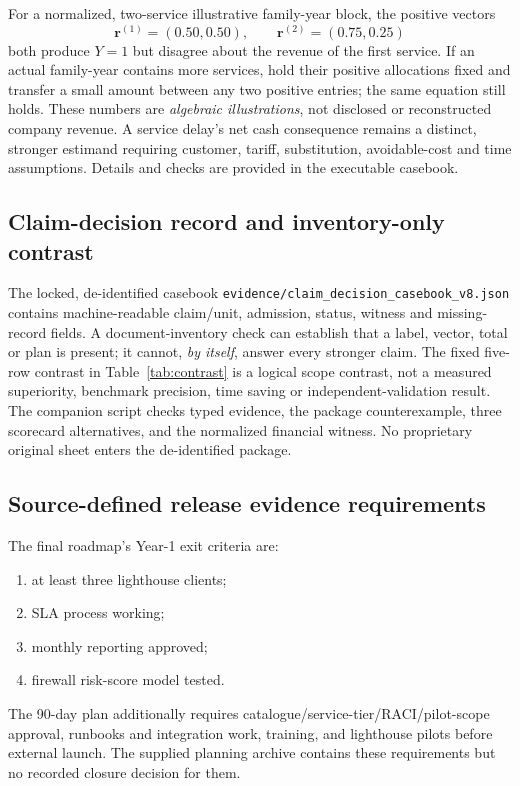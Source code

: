 For a normalized, two-service illustrative family-year block, the positive vectors
\[
\mathbf r^{(1)}=(0.50,0.50),\qquad \mathbf r^{(2)}=(0.75,0.25)
\]
both produce $Y=1$ but disagree about the revenue of the first service. If an actual family-year contains more services, hold their positive allocations fixed and transfer a small amount between any two positive entries; the same equation still holds. These numbers are \emph{algebraic illustrations}, not disclosed or reconstructed company revenue. A service delay's net cash consequence remains a distinct, stronger estimand requiring customer, tariff, substitution, avoidable-cost and time assumptions. Details and checks are provided in the executable casebook.


\subsection{Claim-decision record and inventory-only contrast}\label{app:casebook}
The locked, de-identified casebook \texttt{evidence/claim\_decision\_casebook\_v8.json} contains machine-readable claim/unit, admission, status, witness and missing-record fields. A document-inventory check can establish that a label, vector, total or plan is present; it cannot, \emph{by itself}, answer every stronger claim. The fixed five-row contrast in Table~\ref{tab:contrast} is a logical scope contrast, not a measured superiority, benchmark precision, time saving or independent-validation result. The companion script checks typed evidence, the package counterexample, three scorecard alternatives, and the normalized financial witness. No proprietary original sheet enters the de-identified package.


\subsection{Source-defined release evidence requirements}\label{app:release}
The final roadmap's Year-1 exit criteria are:
\begin{enumerate}[leftmargin=1.4em]
\item at least three lighthouse clients;
\item SLA process working;
\item monthly reporting approved;
\item firewall risk-score model tested.
\end{enumerate}
The 90-day plan additionally requires catalogue/service-tier/RACI/pilot-scope approval, runbooks and integration work, training, and lighthouse pilots before external launch. The supplied planning archive contains these requirements but no recorded closure decision for them.


